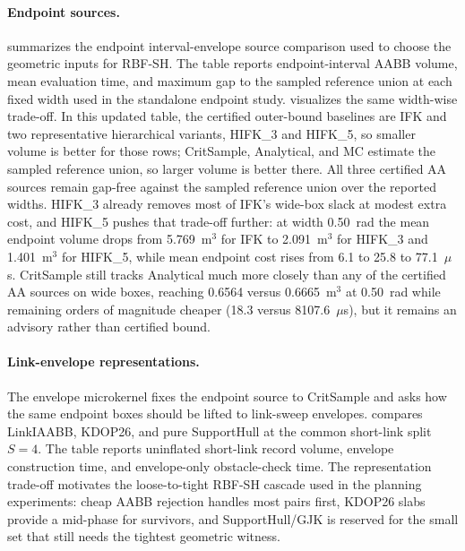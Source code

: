 \documentclass[journal]{IEEEtran}
\begin{document}
\paragraph{Endpoint sources.}
 summarizes the endpoint
interval-envelope source comparison used to choose the geometric inputs for
RBF-SH. The table reports endpoint-interval AABB volume, mean evaluation time,
and maximum gap to the sampled reference union at each fixed width used in the
standalone endpoint study. 
visualizes the same width-wise trade-off. In this updated table, the certified
outer-bound baselines are IFK and two representative hierarchical
variants, HIFK\_3 and HIFK\_5, so smaller volume is better for those rows; CritSample,
Analytical, and MC estimate the sampled reference union, so larger volume is
better there. All three certified AA sources remain gap-free against the
sampled reference union over the reported widths. HIFK\_3 already removes
most of IFK's wide-box slack at modest extra cost, and HIFK\_5 pushes
that trade-off further: at width 0.50~rad the mean endpoint volume drops from
5.769~m$^3$ for IFK to 2.091~m$^3$ for HIFK\_3 and 1.401~m$^3$ for
HIFK\_5, while mean endpoint cost rises from 6.1 to 25.8 to
77.1~$\mu$s. CritSample still tracks Analytical much more closely than any of
the certified AA sources on wide boxes, reaching 0.6564 versus 0.6665~m$^3$
at 0.50~rad while remaining orders of magnitude cheaper (18.3 versus
8107.6~$\mu$s), but it remains an advisory rather than certified bound.

\paragraph{Link-envelope representations.}
The envelope microkernel fixes the endpoint source to CritSample and asks how
the same endpoint boxes should be lifted to link-sweep envelopes.
 compares LinkIAABB, KDOP26, and pure
SupportHull at the common short-link split $S=4$. The table reports uninflated
short-link record volume, envelope construction time, and envelope-only
obstacle-check time. The representation trade-off motivates the loose-to-tight
RBF-SH cascade used in the planning experiments: cheap AABB rejection handles
most pairs first, KDOP26 slabs provide a mid-phase for survivors, and
SupportHull/GJK is reserved for the small set that still needs the tightest
geometric witness.
\end{document}
